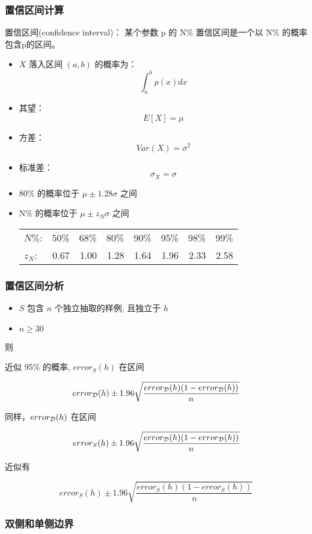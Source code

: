 \documentclass{beamer}
\begin{document}
\begin{frame}
\frametitle{置信区间计算}
\label{sec-3-4}

置信区间(confidence interval)： 某个参数 p 的 N\% 置信区间是一个以 N\% 的概率包含p的区间。

\begin{itemize}
\item $X$ 落入区间 $(a,b)$ 的概率为：
    $$\int_{a}^{b} p(x) dx$$
\item 其望：
    $$E[X] = \mu$$
\item 方差：
    $$Var(X) = \sigma^{2}$$
\item 标准差：
    $$\sigma_{X} = \sigma$$
\end{itemize}


\begin{itemize}
\item 80\% 的概率位于 $\mu \pm 1.28 \sigma$ 之间
\item N\% 的概率位于 $\mu \pm z_{N} \sigma$ 之间

\begin{center}
\begin{tabular}{lrrrrrrr}
 $N\%$:    &  50\%  &  68\%  &  80\%  &  90\%  &  95\%  &  98\%  &  99\%  \\
 $z_{N}$:  &  0.67  &  1.00  &  1.28  &  1.64  &  1.96  &  2.33  &  2.58  \\
\end{tabular}
\end{center}


\end{itemize}
\end{frame}
\begin{frame}
\frametitle{置信区间分析}
\label{sec-3-5}

\begin{itemize}
\item $S$ 包含 $n$ 个独立抽取的样例, 且独立于 $h$
\item $n \geq 30$
\end{itemize}

则

近似 95\% 的概率, $error_{S}(h)$ 在区间

$$error_{\cal{D}}(h) \pm 1.96 \sqrt{\frac{error_{\cal{D}}(h) (1 - error_{\cal{D}}(h))}{n}}$$

同样，$error_{\cal{D}}(h)$ 在区间

\[ error_{S}(h) \pm 1.96 \sqrt{\frac{error_{\cal{D}}(h) (1 - error_{\cal{D}}(h))}{n}} \]

近似有

\[ error_{S}(h) \pm 1.96 \sqrt{\frac{error_{S}(h) (1 - error_{S}(h))}{n}} \]
\end{frame}
\begin{frame}
\frametitle{双侧和单侧边界}
\label{sec-3-6}
\end{frame}
\end{document}

